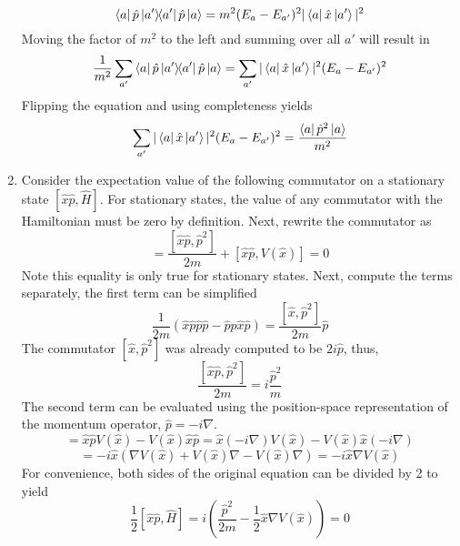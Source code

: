 \begin{sol}
\begin{enumerate}[label=\textbf{(\alph*)}]
\begin{equation}
	\bra a\hat p\ketbra{a'}\hat p\ket a=m^2(E_a-E_{a'})^2|\bra a\hat x\ket{a'}|^2
\end{equation} 
Moving the factor of $m^2$ to the left and summing over all $a'$ will result in
\begin{equation}
	\frac{1}{m^2}\sum_{a'}\bra a\hat p\ketbra{a'}\hat p\ket a=\sum_{a'}|\bra a\hat x\ket{a'}|^2(E_a-E_{a'})^2
\end{equation} 
Flipping the equation and using completeness yields
\begin{equation}
	\sum_{a'}|\bra a\hat x\ket{a'}|^2(E_a-E_{a'})^2=\frac{\bra a\hat p^2\ket a}{m^2}
\end{equation}
\item
Consider the expectation value of the following commutator on a stationary state $[\hat x\hat p,\hat H]$. For stationary states, the value of any commutator with the Hamiltonian must be zero by definition. Next, rewrite the commutator as
\begin{equation}
	[\hat x\hat p, \hat H]=\frac{[\hat x\hat p,\hat p^2]}{2m}+[\hat x\hat p,V(\hat x)]=0
\end{equation}
Note this equality is only true for stationary states. Next, compute the terms separately, the first term can be simplified
\begin{equation}
	\frac{1}{2m}(\hat x\hat p\hat p\hat p-\hat p\hat p\hat x\hat p)=\frac{[\hat x,\hat p^2]}{2m}\hat p
\end{equation} 
The commutator $[\hat x,\hat p^2]$ was already computed to be $2i\hat p$, thus,
\begin{equation}
	\frac{[\hat x\hat p,\hat p^2]}{2m}=i\frac{\hat p^2}{m}
\end{equation}
The second term can be evaluated using the position-space representation of the momentum operator, $\hat p=-i\nabla$. 
\begin{equation}
	[\hat x\hat p,V(\hat x)]=\hat x\hat p V(\hat x)-V(\hat x)\hat x\hat p=\hat x(-i\nabla)V(\hat x)-V(\hat x)\hat x(-i\nabla)
\end{equation}
\begin{equation}
	=-i\hat x(\nabla V(\hat x)+V(\hat x)\nabla-V(\hat x)\nabla)=-i\hat x\nabla V(\hat x)
\end{equation}
For convenience, both sides of the original equation can be divided by 2 to yield
\begin{equation}
	\frac{1}{2}[\hat x\hat p, \hat H]=i\left(\frac{\hat p^2}{2m}-\frac{1}{2}\hat x\nabla V(\hat x)\right)=0

\end{equation}
\end{enumerate}
\end{sol}
